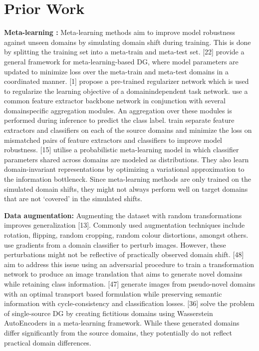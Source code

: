 \documentclass[review]{cvpr}
\begin{document}
\section{Prior Work}

\textbf{Meta-learning :} 
Meta-learning methods aim to improve
model robustness against unseen domains by simulating domain shift during training. This is done by splitting the
training set into a meta-train and meta-test set. [22] provide
a general framework for meta-learning-based DG, where model parameters are updated to minimize loss over the meta-train and meta-test domains in a coordinated manner. [1] propose a pre-trained regularizer network which
is used to regularize the learning objective of a domainindependent task network. \cite{Authors3} use a common feature extractor backbone network in conjunction with several domainspecific aggregation modules. An aggregation over these
modules is performed during inference to predict the class
label. \cite{Authors4} train separate feature extractors and classifiers on each of the source domains and minimize the loss
on mismatched pairs of feature extractors and classifiers
to improve model robustness. [15] utilise a probabilistic
meta-learning model in which classifier parameters shared
across domains are modeled as distributions. They also
learn domain-invariant representations by optimizing a variational approximation to the information bottleneck. Since
meta-learning methods are only trained on the simulated domain shifts, they might not always perform well on target
domains that are not ‘covered’ in the simulated shifts.

\noindent\textbf{Data augmentation:} 
Augmenting the dataset with random transformations improves generalization [13]. Commonly used augmentation techniques include rotation, flipping, random cropping, random colour distortions, amongst
others. \cite{Alpher02} use gradients from a domain classifier to perturb images. However, these perturbations might not be reflective of practically observed domain shift. [48] aim to
address this issue using an adversarial procedure to train a
transformation network to produce an image translation that
aims to generate novel domains while retaining class information. [47] generate images from pseudo-novel domains
with an optimal transport based formulation while preserving semantic information with cycle-consistency and classification losses. [36] solve the problem of single-source
DG by creating fictitious domains using Wasserstein AutoEncoders in a meta-learning framework. While these generated domains differ significantly from the source domains,
they potentially do not reflect practical domain differences.
\end{document}
